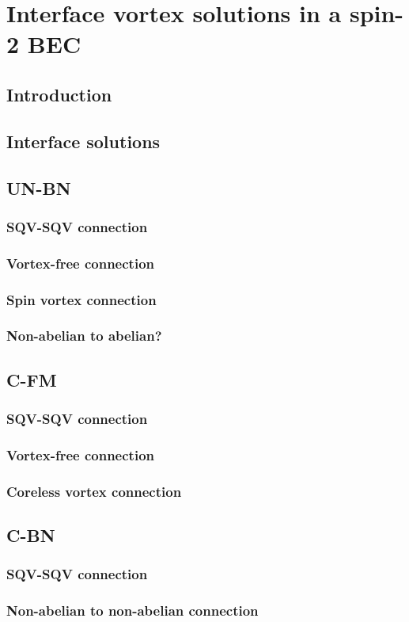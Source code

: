 \chapter{Interface vortex solutions in a spin-2 BEC}

\section{Introduction}

\section{Interface solutions}

\section{UN-BN}
\subsection{SQV-SQV connection}
\subsection{Vortex-free connection}
\subsection{Spin vortex connection}
\subsection{Non-abelian to abelian?}

\section{C-FM}
\subsection{SQV-SQV connection}
\subsection{Vortex-free connection}
\subsection{Coreless vortex connection}

\section{C-BN}
\subsection{SQV-SQV connection}
\subsection{Non-abelian to non-abelian connection}
